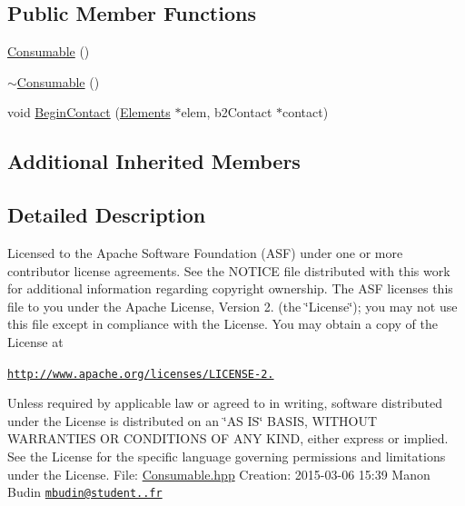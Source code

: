 \subsection*{Public Member Functions}
\begin{DoxyCompactItemize}
\item 
\hyperlink{class_consumable_ae374944f6333618dd08318b98b6950c7}{Consumable} ()
\item 
\hyperlink{class_consumable_aed7671d58f80f5244e5851f591e4b8a2}{$\sim$\-Consumable} ()
\item 
void \hyperlink{class_consumable_adb866e69c3796edffad832b88e527518}{Begin\-Contact} (\hyperlink{class_elements}{Elements} $\ast$elem, b2\-Contact $\ast$contact)
\end{DoxyCompactItemize}
\subsection*{Additional Inherited Members}


\subsection{Detailed Description}
Licensed to the Apache Software Foundation (A\-S\-F) under one or more contributor license agreements. See the N\-O\-T\-I\-C\-E file distributed with this work for additional information regarding copyright ownership. The A\-S\-F licenses this file to you under the Apache License, Version 2. (the \char`\"{}\-License\char`\"{}); you may not use this file except in compliance with the License. You may obtain a copy of the License at

\href{http://www.apache.org/licenses/LICENSE-2.0}{\tt http\-://www.\-apache.\-org/licenses/\-L\-I\-C\-E\-N\-S\-E-\/2.}

Unless required by applicable law or agreed to in writing, software distributed under the License is distributed on an \char`\"{}\-A\-S I\-S\char`\"{} B\-A\-S\-I\-S, W\-I\-T\-H\-O\-U\-T W\-A\-R\-R\-A\-N\-T\-I\-E\-S O\-R C\-O\-N\-D\-I\-T\-I\-O\-N\-S O\-F A\-N\-Y K\-I\-N\-D, either express or implied. See the License for the specific language governing permissions and limitations under the License. File\-: \hyperlink{_consumable_8hpp}{Consumable.\-hpp} Creation\-: 2015-\/03-\/06 15\-:39 Manon Budin \href{mailto:mbudin@student.42.fr}{\tt mbudin@student..\-fr} 

